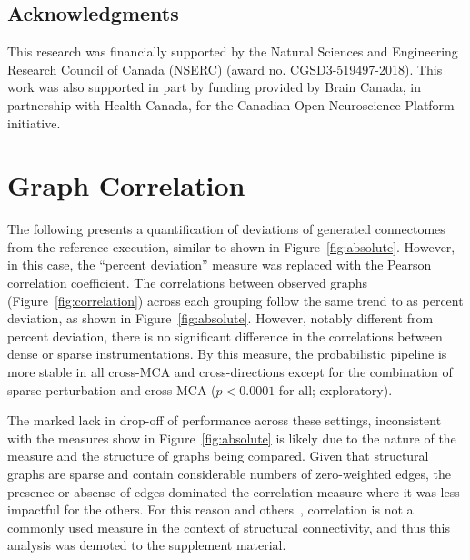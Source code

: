 \documentclass[fleqn,10pt]{SelfArx} %
\newcommand{\new}[1]{{#1}}
\begin{document}
\subsection*{Acknowledgments} 
This research was financially supported by the Natural Sciences and Engineering Research Council of Canada (NSERC)
(award no. CGSD3-519497-2018). This work was also supported in part by funding provided by Brain Canada, in partnership
with Health Canada, for the Canadian Open Neuroscience Platform initiative.




\beginsupplement

\clearpage
\section{Graph Correlation}
\label{supsec:correlation}
The following presents a quantification of deviations of generated connectomes from the reference execution, similar
to shown in Figure~\ref{fig:absolute}. However, in this case, the ``percent deviation'' measure was replaced with the
Pearson correlation coefficient. The correlations between observed graphs (Figure~\ref{fig:correlation}) across each
grouping follow the same trend to as percent deviation, as shown in Figure~\ref{fig:absolute}. However, notably
different from percent deviation, there is no significant difference in the correlations between \new{dense} or
\new{sparse} instrumentations. By this measure, the probabilistic pipeline is more stable in all cross-MCA and
cross-directions except for the combination of \new{sparse} perturbation and cross-MCA ($p < 0.0001$ for all;
exploratory).

The marked lack in drop-off of performance across these settings, inconsistent with the measures show in
Figure~\ref{fig:absolute} is \new{likely due} to the nature of the measure and the \new{structure of graphs being compared}.
Given that structural graphs are sparse and contain considerable numbers of zero-weighted edges, the presence or
absense of edges dominated the correlation measure where it was less impactful for the others. For this reason and
others~\cite{huang2016linking}, correlation is not a commonly used measure in the context of structural connectivity\new{,
and thus this analysis was demoted to the supplement material}.
\end{document}
